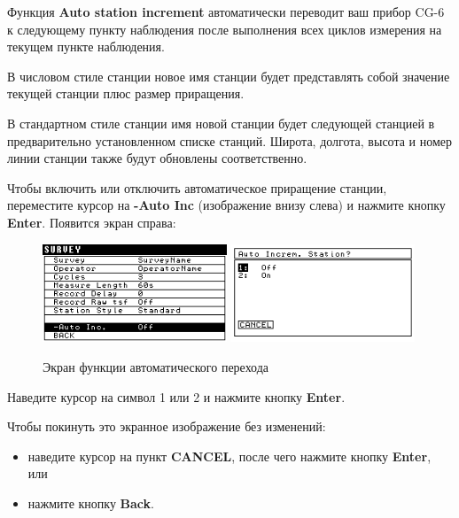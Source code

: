 Функция \textbf{Auto station increment} автоматически переводит ваш прибор CG-6
к следующему пункту наблюдения после выполнения всех циклов измерения на текущем
пункте наблюдения.

В числовом стиле станции новое имя станции будет представлять собой значение
текущей станции плюс размер приращения.

В стандартном стиле станции имя новой станции будет следующей станцией в
предварительно установленном списке станций. Широта, долгота, высота и номер
линии станции также будут обновлены соответственно.

Чтобы включить или отключить автоматическое приращение станции, переместите
курсор на \textbf{-Auto Inc} (изображение внизу слева) и нажмите кнопку
\textbf{Enter}. Появится экран справа:

\begin{figure}[H]
  \centering
  \includegraphics[width=0.49\textwidth]{figures/the_automatic_increment_screen_1}
  \includegraphics[width=0.49\textwidth]{figures/the_automatic_increment_screen_2}
  \caption{Экран функции автоматического перехода}
  \label{fig:the_automatic_increment_screen}
\end{figure}

Наведите курсор на символ 1 или 2 и нажмите кнопку \textbf{Enter}.

Чтобы покинуть это экранное изображение без изменений:
\begin{itemize}
  \item наведите курсор на пункт \textbf{CANCEL}, после чего нажмите кнопку
    \textbf{Enter}, или

  \item нажмите кнопку \textbf{Back}.
\end{itemize}

